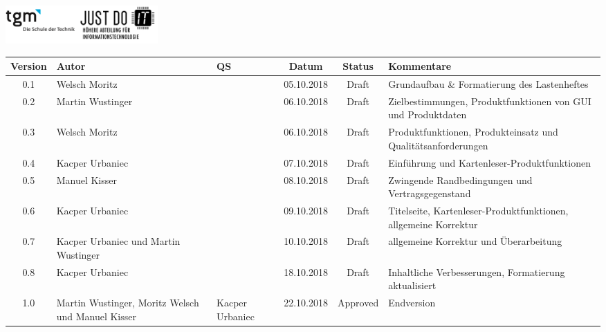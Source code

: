 \documentclass[minted, notitle]{protocol}
\newcommand{\draft}{\cellcolor{Peach} Draft}
\newcommand{\abgabe}{\cellcolor{LimeGreen}Approved }
\begin{document}
\begin{titlepage}
{		%
		{\vspace{0.3cm}\includegraphics[width=220]{images/tgm_full.png}}
	}
\end{titlepage}


\begin{center}

\begin{tabular}{| c | p{1.8cm} | p{1.8cm} | c | c | p{3.4cm} |}
\hline \rowcolor{gray} \textbf{\color{white}Version} & \textbf{\color{white}Autor} & \textbf{\color{white}QS} & \textbf{\color{white}Datum} & \textbf{\color{white}Status} & \textbf{\color{white}Kommentare} \\ 
 \hline \hline
 0.1 & Welsch Moritz && 05.10.2018 & \draft & Grundaufbau \& Formatierung des Lastenheftes\\
 \hline  
 0.2 & Martin Wustinger && 06.10.2018 & \draft& Zielbestimmungen, Produktfunktionen von GUI und Produktdaten \\
 \hline    
  0.3 & Welsch Moritz && 06.10.2018 & \draft & Produktfunktionen, Produkteinsatz und Qualitätsanforderungen \\
 \hline 
 0.4 & Kacper Urbaniec && 07.10.2018 & \draft & Einführung und Kartenleser-Produktfunktionen  \\
 \hline
 0.5 & Manuel Kisser && 08.10.2018 & \draft & Zwingende Randbedingungen und Vertragsgegenstand  \\
 \hline
  0.6 & Kacper Urbaniec && 09.10.2018 & \draft & Titelseite, Kartenleser-Produktfunktionen, allgemeine Korrektur  \\
 \hline
  0.7 & Kacper Urbaniec und Martin Wustinger && 10.10.2018 & \draft & allgemeine Korrektur und Überarbeitung \\
 \hline
 0.8 & Kacper Urbaniec && 18.10.2018 & \draft & Inhaltliche Verbesserungen, Formatierung aktualisiert \\ 
 \hline
 1.0 & Martin Wustinger, Moritz Welsch und Manuel Kisser & Kacper Urbaniec& 22.10.2018& \abgabe &Endversion\\
 \hline
\end{tabular}
\end{center}

\clearpage
{ %
  \hypersetup{linkcolor=black}
  \tableofcontents
} 
\clearpage

\end{document}
